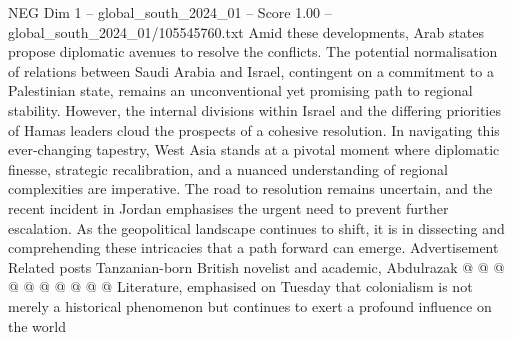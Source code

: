 \begin{textsample}{NEG Dim 1 – global\_south\_2024\_01 – Score 1.00 – global\_south\_2024\_01/105545760.txt}
Amid these developments, Arab states propose diplomatic avenues to resolve the conflicts.
The potential normalisation of relations between Saudi Arabia and Israel, contingent on a commitment to a Palestinian state, remains an unconventional yet promising path to regional stability.
However, the internal divisions within Israel and the differing priorities of Hamas leaders cloud the prospects of a cohesive resolution.
In navigating this ever-changing tapestry, West Asia stands at a pivotal moment where diplomatic finesse, strategic recalibration, and a nuanced understanding of regional complexities are imperative.
The road to resolution remains uncertain, and the recent incident in Jordan emphasises the urgent need to prevent further escalation.
As the geopolitical landscape continues to shift, it is in dissecting and comprehending these intricacies that a path forward can emerge.
Advertisement Related posts Tanzanian-born British novelist and academic, Abdulrazak @ @ @ @ @ @ @ @ @ @ Literature, emphasised on Tuesday that colonialism is not merely a historical phenomenon but continues to exert a profound influence on the world

\end{textsample}
